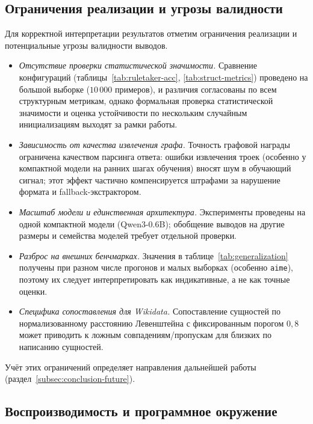 \subsection{Ограничения реализации и угрозы валидности}
\label{subsec:impl-limitations}

Для корректной интерпретации результатов отметим ограничения реализации и потенциальные угрозы валидности выводов.
\begin{itemize}
    \setlength{\itemsep}{\smallskipamount}
    \item \textit{Отсутствие проверки статистической значимости.} Сравнение конфигураций (таблицы~\ref{tab:ruletaker-acc}, \ref{tab:struct-metrics}) проведено на большой выборке ($10\,000$ примеров), и различия согласованы по всем структурным метрикам, однако формальная проверка статистической значимости и оценка устойчивости по нескольким случайным инициализациям выходят за рамки работы.
    \item \textit{Зависимость от качества извлечения графа.} Точность графовой награды ограничена качеством парсинга ответа: ошибки извлечения троек (особенно у компактной модели на ранних шагах обучения) вносят шум в обучающий сигнал; этот эффект частично компенсируется штрафами за нарушение формата и fallback-экстрактором.
    \item \textit{Масштаб модели и единственная архитектура.} Эксперименты проведены на одной компактной модели (Qwen3-0.6B); обобщение выводов на другие размеры и семейства моделей требует отдельной проверки.
    \item \textit{Разброс на внешних бенчмарках.} Значения в таблице~\ref{tab:generalization} получены при разном числе прогонов и малых выборках (особенно \texttt{aime}), поэтому их следует интерпретировать как индикативные, а не как точные оценки.
    \item \textit{Специфика сопоставления для Wikidata.} Сопоставление сущностей по нормализованному расстоянию Левенштейна с фиксированным порогом $0{,}8$ может приводить к ложным совпадениям/пропускам для близких по написанию сущностей.
\end{itemize}
Учёт этих ограничений определяет направления дальнейшей работы (раздел~\ref{subsec:conclusion-future}).

\subsection{Воспроизводимость и программное окружение}
\label{subsec:impl-repro}

